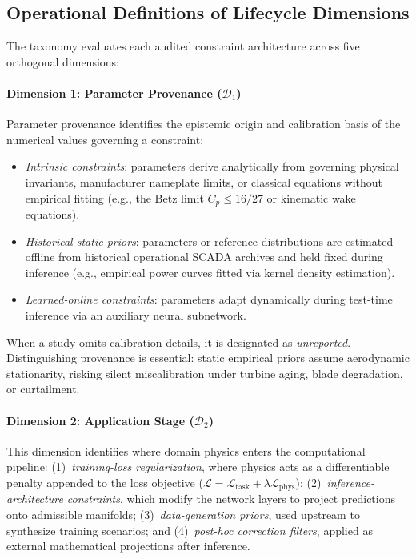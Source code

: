 \subsection{Operational Definitions of Lifecycle Dimensions}
The taxonomy evaluates each audited constraint architecture across five orthogonal dimensions:

\paragraph{Dimension 1: Parameter Provenance ($\mathcal{D}_1$)}
Parameter provenance identifies the epistemic origin and calibration basis of the numerical values governing a constraint:
\begin{itemize}[leftmargin=1.5em,itemsep=1pt,topsep=2pt]
\item \textit{Intrinsic constraints}: parameters derive analytically from governing physical invariants, manufacturer nameplate limits, or classical equations without empirical fitting (e.g., the Betz limit $C_p \le 16/27$ or kinematic wake equations).
\item \textit{Historical-static priors}: parameters or reference distributions are estimated offline from historical operational SCADA archives and held fixed during inference (e.g., empirical power curves fitted via kernel density estimation).
\item \textit{Learned-online constraints}: parameters adapt dynamically during test-time inference via an auxiliary neural subnetwork.
\end{itemize}
When a study omits calibration details, it is designated as \textit{unreported}. Distinguishing provenance is essential: static empirical priors assume aerodynamic stationarity, risking silent miscalibration under turbine aging, blade degradation, or curtailment.

\paragraph{Dimension 2: Application Stage ($\mathcal{D}_2$)}
This dimension identifies where domain physics enters the computational pipeline:
(1)~\textit{training-loss regularization}, where physics acts as a differentiable penalty appended to the loss objective ($\mathcal{L} = \mathcal{L}_{\text{task}} + \lambda \mathcal{L}_{\text{phys}}$);
(2)~\textit{inference-architecture constraints}, which modify the network layers to project predictions onto admissible manifolds;
(3)~\textit{data-generation priors}, used upstream to synthesize training scenarios; and
(4)~\textit{post-hoc correction filters}, applied as external mathematical projections after inference.

